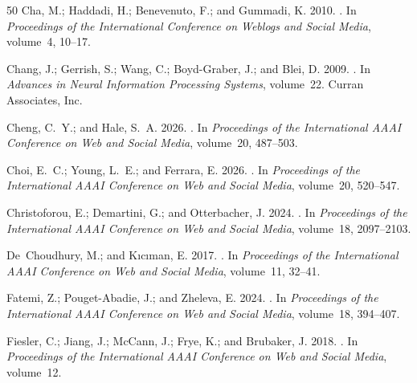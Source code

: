 \begin{thebibliography}{50}
Cha, M.; Haddadi, H.; Benevenuto, F.; and Gummadi, K. 2010.
.
\newblock In \emph{Proceedings of the International Conference on Weblogs and Social Media}, volume~4, 10--17.

Chang, J.; Gerrish, S.; Wang, C.; Boyd-Graber, J.; and Blei, D. 2009.
.
\newblock In \emph{Advances in Neural Information Processing Systems}, volume~22. Curran Associates, Inc.

Cheng, C.~Y.; and Hale, S.~A. 2026.
.
\newblock In \emph{Proceedings of the International AAAI Conference on Web and Social Media}, volume~20, 487--503.

Choi, E.~C.; Young, L.~E.; and Ferrara, E. 2026.
.
\newblock In \emph{Proceedings of the International AAAI Conference on Web and Social Media}, volume~20, 520--547.

Christoforou, E.; Demartini, G.; and Otterbacher, J. 2024.
.
\newblock In \emph{Proceedings of the International AAAI Conference on Web and Social Media}, volume~18, 2097--2103.

De~Choudhury, M.; and K{\i}c{\i}man, E. 2017.
.
\newblock In \emph{Proceedings of the International AAAI Conference on Web and Social Media}, volume~11, 32--41.

Fatemi, Z.; Pouget-Abadie, J.; and Zheleva, E. 2024.
.
\newblock In \emph{Proceedings of the International AAAI Conference on Web and Social Media}, volume~18, 394--407.

Fiesler, C.; Jiang, J.; McCann, J.; Frye, K.; and Brubaker, J. 2018.
.
\newblock In \emph{Proceedings of the International AAAI Conference on Web and Social Media}, volume~12.


\end{thebibliography}

